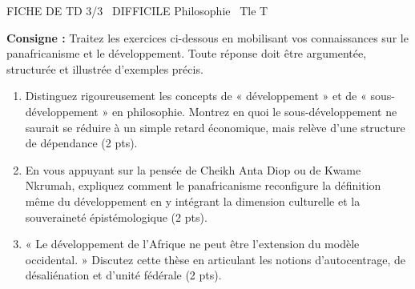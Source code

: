 \documentclass[11pt]{article}
\begin{document}
\begin{tcolorbox}[enhanced,colback=popink,colframe=popink,arc=10pt,boxrule=0pt,left=12pt,right=12pt,top=9pt,bottom=9pt]
{\color{white}\popxbold\small FICHE DE TD 3/3 \textbullet\ DIFFICILE \hfill Philosophie \textbullet\ Tle T\par}
\end{tcolorbox}
\vspace{4pt}
\noindent \textbf{Consigne :} Traitez les exercices ci-dessous en mobilisant vos connaissances sur le panafricanisme et le développement. Toute réponse doit être argumentée, structurée et illustrée d'exemples précis.

\begin{exercice}
\begin{enumerate}
    \item Distinguez rigoureusement les concepts de « développement » et de « sous-développement » en philosophie. Montrez en quoi le sous-développement ne saurait se réduire à un simple retard économique, mais relève d'une structure de dépendance (2 pts).
    \item En vous appuyant sur la pensée de Cheikh Anta Diop ou de Kwame Nkrumah, expliquez comment le panafricanisme reconfigure la définition même du développement en y intégrant la dimension culturelle et la souveraineté épistémologique (2 pts).
    \item « Le développement de l'Afrique ne peut être l'extension du modèle occidental. » Discutez cette thèse en articulant les notions d'autocentrage, de désaliénation et d'unité fédérale (2 pts).
\end{enumerate}
\end{exercice}
\end{document}
